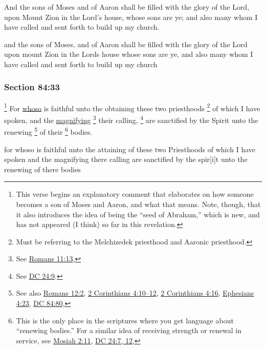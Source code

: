 		And the sons of Moses and of Aaron shall be filled with the glory of the Lord, upon Mount Zion in the Lord's house, whose sons are ye; and also many whom I have called and sent forth to build up my church.

		\begin{framed}
		\scriptsize
			\begin{compactdesc}
				\item[JSP] and the sons of Moses, and of Aaron shall be filled with the glory of the Lord upon mount Zion in the Lords house whose sons are ye, and also many whom I have called and sent forth to build up my church
			\end{compactdesc}
		\end{framed}

	\subsubsection{Section 84:33} %
		\label{DC84-33}

			\footnote{%
				This verse begins an explanatory comment that elaborates on how someone becomes a son of Moses and Aaron, and what that means. Note, though, that it also introduces the idea of being the ``seed of Abraham,'' which is new, and has not appeared (I think) so far in this revelation.
				}%
		For \hyperref[WHOSO]{whoso} is faithful unto the obtaining these two priesthoods%
			\footnote{%
				Must be referring to the Melchizedek priesthood and Aaronic priesthood.
				}
		of which I have spoken, and the \hyperref[MAGNIFY]{magnifying}%
			\footnote{%
				See \hyperref[ROMANS-11-13]{Romans 11:13}, 
				}
		their calling,%
			\footnote{%
				See \hyperref[DC24-9]{DC 24:9}.
				}
		are sanctified by the Spirit unto the renewing%
			\footnote{%
				See also \hyperref[ROMANS-12-2]{Romans 12:2}, \hyperref[2CORINTHIANS-4-10]{2 Corinthians 4:10--12}, \hyperref[2CORINTHIANS-4-16]{2 Corinthians 4:16}, \hyperref[EPHESIANS4-23]{Ephesians 4:23}, \hyperref[DC84-80]{DC 84:80},
				}
		of their
			\footnote{%
				This is the only place in the scriptures where you get language about ``renewing bodies.'' For a similar idea of receiving strength or renewal in service, see \hyperref[MOSIAH-2-11]{Mosiah 2:11}, \hyperref[DC24-7]{DC 24:7, 12},
				}%
		bodies.

		\begin{framed}
		\scriptsize
			\begin{compactdesc}
				\item[JSP] for whoso is faithful unto the attaining of these two Priesthoods of which I have spoken and the magnifying there calling are sanctified by the spir[i]t unto the renewing of there bodies
			\end{compactdesc}
		\end{framed}


